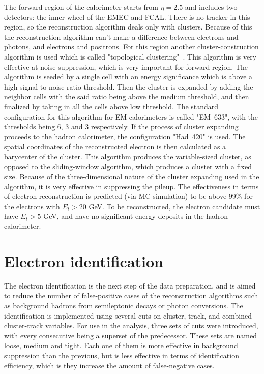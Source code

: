 The forward region of the calorimeter starts from $\eta = 2.5$ and includes two detectors: the inner wheel of the EMEC and FCAL. There is no tracker in this region, so the reconstruction algorithm deals only with clusters. Because of this the reconstruction algorithm can't make a difference between electrons and photons, and electrons and positrons. For this region another cluster-construction algorithm is used which is called "topological clustering"~\cite{lib:elec_reco_fwd}. This algorithm is very effective at noise suppression, which is very important for forward region. The algorithm is seeded by a single cell with an energy significance which is above a high signal to noise ratio threshold. Then the cluster is expanded by adding the neighbor cells with the said ratio being above the medium threshold, and then finalized by taking in all the cells above low threshold. The standard configuration for this algorithm for EM calorimeters is called "EM~633", with the thresholds being 6, 3 and 3 respectively. If the process of cluster expanding proceeds to the hadron calorimeter, the configuration "Had~420" is used. The spatial coordinates of the reconstructed electron is then calculated as a barycenter of the cluster. This algorithm produces the variable-sized cluster, as opposed to the sliding-window algorithm, which produces a cluster with a fixed size. Because of the three-dimensional nature of the cluster expanding used in the algorithm, it is very effective in suppressing the pileup. The effectiveness in terms of electron reconstruction is predicted (via MC simulation) to be above 99\% for the electrons with $E_{t} > 20$ GeV. To be reconstructed, the electron candidate must have $E_{t} > 5$ GeV, and have no significant energy deposits in the hadron calorimeter.

\section{Electron identification}
\label{sec:Rec_elecID}

The electron identification is the next step of the data preparation, and is aimed to reduce the number of false-positive cases of the reconstruction algorithms such as background hadrons from semileptonic decays or photon conversions. The identification is implemented using several cuts on cluster, track, and combined cluster-track variables. For use in the analysis, three sets of cuts were introduced, with every consecutive being a superset of the predecessor. These sets are named loose, medium and tight. Each one of them is more effective in background suppression than the previous, but is less effective in terms of identification efficiency, which is they increase the amount of false-negative cases.

